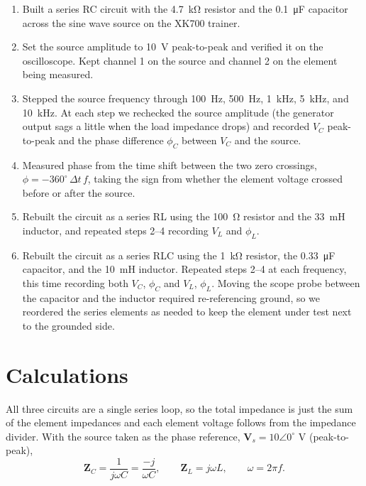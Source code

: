 \documentclass[11pt]{article}
\begin{document}
\begin{enumerate}
    \item Built a series RC circuit with the \SI{4.7}{\kilo\ohm} resistor and the
          \SI{0.1}{\micro\farad} capacitor across the sine wave source on the
          XK700 trainer.
    \item Set the source amplitude to \SI{10}{\volt} peak-to-peak and verified it
          on the oscilloscope. Kept channel 1 on the source and channel 2 on the
          element being measured.
    \item Stepped the source frequency through \SI{100}{\hertz},
          \SI{500}{\hertz}, \SI{1}{\kilo\hertz}, \SI{5}{\kilo\hertz}, and
          \SI{10}{\kilo\hertz}. At each step we rechecked the source amplitude
          (the generator output sags a little when the load impedance drops) and
          recorded $V_C$ peak-to-peak and the phase difference $\phi_C$ between
          $V_C$ and the source.
    \item Measured phase from the time shift between the two zero crossings,
          $\phi = -360^\circ \, \Delta t \, f$, taking the sign from whether the
          element voltage crossed before or after the source.
    \item Rebuilt the circuit as a series RL using the \SI{100}{\ohm} resistor and
          the \SI{33}{\milli\henry} inductor, and repeated steps 2--4 recording
          $V_L$ and $\phi_L$.
    \item Rebuilt the circuit as a series RLC using the \SI{1}{\kilo\ohm}
          resistor, the \SI{0.33}{\micro\farad} capacitor, and the
          \SI{10}{\milli\henry} inductor. Repeated steps 2--4 at each frequency,
          this time recording both $V_C$, $\phi_C$ and $V_L$, $\phi_L$. Moving the
          scope probe between the capacitor and the inductor required
          re-referencing ground, so we reordered the series elements as needed to
          keep the element under test next to the grounded side.
\end{enumerate}

\section*{Calculations}

All three circuits are a single series loop, so the total impedance is just the
sum of the element impedances and each element voltage follows from the impedance
divider. With the source taken as the phase reference,
$\mathbf{V}_s = 10\angle 0^\circ$ V (peak-to-peak),
\[
    \mathbf{Z}_C = \frac{1}{j\omega C} = \frac{-j}{\omega C},
    \qquad
    \mathbf{Z}_L = j\omega L,
    \qquad
    \omega = 2\pi f .
\]
\end{document}
